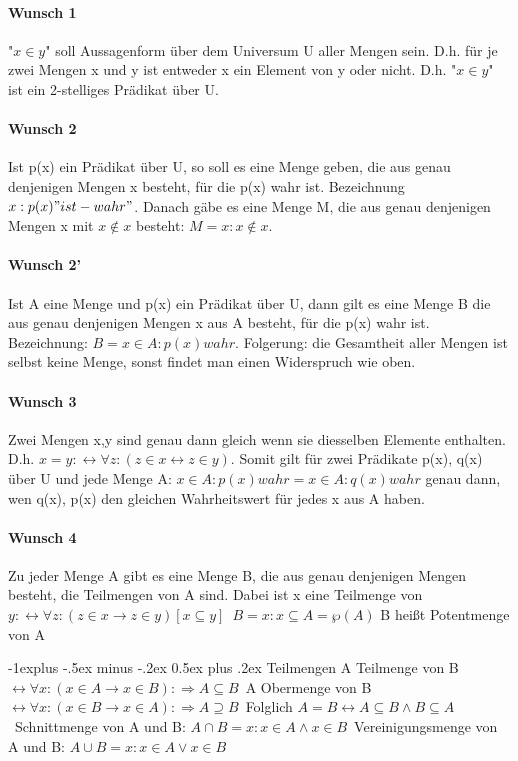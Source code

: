 \documentclass[10pt,landscape]{article}
\makeatletter
\renewcommand{\subsection}{\@startsection{subsection}{2}{0mm}%
                                {-1explus -.5ex minus -.2ex}%
                                {0.5ex plus .2ex}%
                                {\normalfont\normalsize\bfseries}}
\makeatother
\begin{document}
\begin{multicols}{3}
\paragraph{Wunsch 1}
"$x\in y$" soll Aussagenform über dem Universum U aller Mengen sein. D.h. für je zwei Mengen x und y ist entweder x ein Element von y oder nicht. D.h. "$x\in y$" ist ein 2-stelliges Prädikat über U.

\paragraph{Wunsch 2}
Ist p(x) ein Prädikat über U, so soll es eine Menge geben, die aus genau denjenigen Mengen x besteht, für die p(x) wahr ist. Bezeichnung ${x:p(x) "ist-wahr" }$.
Danach gäbe es eine Menge M, die aus genau denjenigen Mengen x mit $x\not \in x$ besteht: $M={x:x\not \in x}$.

\paragraph{Wunsch 2'}
Ist A eine Menge und p(x) ein Prädikat über U, dann gilt es eine Menge B die aus genau denjenigen Mengen x aus A besteht, für die p(x) wahr ist. Bezeichnung: $B={x\in A:p(x) wahr}$.
Folgerung: die Gesamtheit aller Mengen ist selbst keine Menge, sonst findet man einen Widerspruch wie oben.

\paragraph{Wunsch 3}
Zwei Mengen x,y sind genau dann gleich wenn sie diesselben Elemente enthalten. D.h. $x=y: \leftrightarrow \forall z:(z\in x \leftrightarrow z\in y)$. Somit gilt für zwei Prädikate p(x), q(x) über U und jede Menge A: ${x\in A: p(x) wahr} = {x\in A: q(x) wahr}$ genau dann, wen q(x), p(x) den gleichen Wahrheitswert für jedes x aus A haben.

\paragraph{Wunsch 4}
Zu jeder Menge A gibt es eine Menge B, die aus genau denjenigen Mengen besteht, die Teilmengen von A sind. Dabei ist x eine Teilmenge von $y: \leftrightarrow \forall z:(z\in x \rightarrow z \in y) [x \subseteq y]$\
$B={x:x\subseteq A}=\wp(A)$ B heißt Potentmenge von A\

\subsection{Teilmengen}
A Teilmenge von B $\leftrightarrow \forall x: (x\in A \rightarrow x \in B):\Rightarrow A\subseteq B$\
A Obermenge von B $\leftrightarrow \forall x: (x\in B \rightarrow x \in A):\Rightarrow A\supseteq B$\
Folglich $A=B \leftrightarrow A\subseteq B \wedge B\subseteq A$\
Schnittmenge von A und B: $A\cap B = {x: x\in A \wedge x\in B}$\
Vereinigungsmenge von A und B: $A\cup B = {x: x\in A \vee x\in B}$


\end{multicols}
\end{document}
